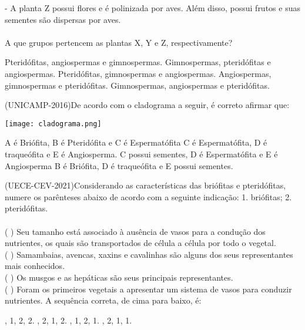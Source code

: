 \documentclass[12pt,a4paper]{exam}
\begin{document}
\begin{questions}
- A planta Z possui flores e é polinizada por aves. Além disso, possui frutos e suas sementes são dispersas por aves.\\\\
A que grupos pertencem as plantas X, Y e Z, respectivamente?\\
\begin{choices}
    \choice Pteridófitas, angiospermas e gimnospermas.
    \choice Gimnospermas, pteridófitas e angiospermas.
    \choice 
Pteridófitas, gimnospermas e angiospermas.
    \choice Angiospermas, gimnospermas e pteridófitas.
    \choice Gimnospermas, angiospermas e pteridófitas.\\
\end{choices}

\question (UNICAMP-2016)De acordo com o cladograma a seguir, é correto afirmar que:
\begin{center}
    \texttt{[image: cladograma.png]} 
\end{center}
\begin{choices}
    \choice A é Briófita, B é Pteridófita e C é Espermatófita
    \choice C é Espermatófita, D é traqueófita e E é Angiosperma.
    \choice C possui sementes, D é Espermatófita e E é Angiosperma
    \choice B é Briófita, D é traqueófita e E possui sementes.\\
\end{choices}

\question (UECE-CEV-2021)Considerando as características das briófitas e pteridófitas, numere os parênteses abaixo de acordo com a seguinte indicação:
1. briófitas; 2. pteridófitas.\\\\
( ) Seu tamanho está associado à ausência de vasos para a condução dos nutrientes, os quais são transportados de célula a célula por todo o vegetal.\\ ( ) Samambaias, avencas, xaxins e cavalinhas são alguns dos seus representantes mais conhecidos.\\ ( ) Os musgos e as hepáticas são seus principais representantes.\\ ( ) Foram os primeiros vegetais a apresentar um sistema de vasos para conduzir nutrientes.
A sequência correta, de cima para baixo, é:\\
\begin{choices}
    , 1, 2, 2.
    , 2, 1, 2.
    , 1, 2, 1.
    , 2, 1, 1.\\
\end{choices}


\end{questions}
\end{document}
